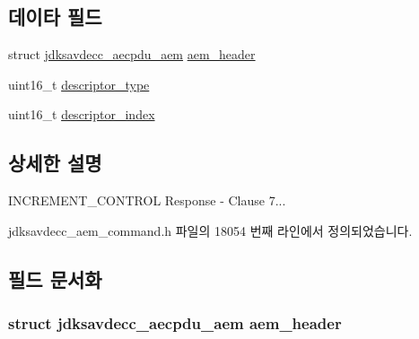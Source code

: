 \subsection*{데이타 필드}
\begin{DoxyCompactItemize}
\item 
struct \hyperlink{structjdksavdecc__aecpdu__aem}{jdksavdecc\+\_\+aecpdu\+\_\+aem} \hyperlink{structjdksavdecc__aem__command__increment__control__response_ae1e77ccb75ff5021ad923221eab38294}{aem\+\_\+header}
\item 
uint16\+\_\+t \hyperlink{structjdksavdecc__aem__command__increment__control__response_ab7c32b6c7131c13d4ea3b7ee2f09b78d}{descriptor\+\_\+type}
\item 
uint16\+\_\+t \hyperlink{structjdksavdecc__aem__command__increment__control__response_a042bbc76d835b82d27c1932431ee38d4}{descriptor\+\_\+index}
\end{DoxyCompactItemize}


\subsection{상세한 설명}
I\+N\+C\+R\+E\+M\+E\+N\+T\+\_\+\+C\+O\+N\+T\+R\+OL Response -\/ Clause 7... 

jdksavdecc\+\_\+aem\+\_\+command.\+h 파일의 18054 번째 라인에서 정의되었습니다.



\subsection{필드 문서화}
\subsubsection[{\texorpdfstring{aem\+\_\+header}{aem_header}}]{\setlength{\rightskip}{0pt plus 5cm}struct {\bf jdksavdecc\+\_\+aecpdu\+\_\+aem} aem\+\_\+header}\hypertarget{structjdksavdecc__aem__command__increment__control__response_ae1e77ccb75ff5021ad923221eab38294}{}\label{structjdksavdecc__aem__command__increment__control__response_ae1e77ccb75ff5021ad923221eab38294}


